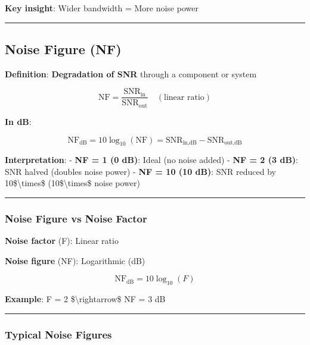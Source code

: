 \textbf{Key insight}: Wider bandwidth = More noise power

\begin{center}\rule{0.5\linewidth}{0.5pt}\end{center}

\subsection{Noise Figure (NF)}\label{noise-figure-nf}

\textbf{Definition}: \textbf{Degradation of SNR} through a component or
system

\[
\text{NF} = \frac{\text{SNR}_{\text{in}}}{\text{SNR}_{\text{out}}} \quad (\text{linear ratio})
\]

\textbf{In dB}:

\[
\text{NF}_{\text{dB}} = 10\log_{10}(\text{NF}) = \text{SNR}_{\text{in,dB}} - \text{SNR}_{\text{out,dB}}
\]

\textbf{Interpretation}: - \textbf{NF = 1 (0 dB)}: Ideal (no noise
added) - \textbf{NF = 2 (3 dB)}: SNR halved (doubles noise power) -
\textbf{NF = 10 (10 dB)}: SNR reduced by 10\$\textbackslash times\$
(10\$\textbackslash times\$ noise power)

\begin{center}\rule{0.5\linewidth}{0.5pt}\end{center}

\subsubsection{Noise Figure vs Noise
Factor}\label{noise-figure-vs-noise-factor}

\textbf{Noise factor} (F): Linear ratio

\textbf{Noise figure} (NF): Logarithmic (dB)

\[
\text{NF}_{\text{dB}} = 10\log_{10}(F)
\]

\textbf{Example}: F = 2 \$\textbackslash rightarrow\$ NF = 3 dB

\begin{center}\rule{0.5\linewidth}{0.5pt}\end{center}

\subsubsection{Typical Noise Figures}\label{typical-noise-figures}

